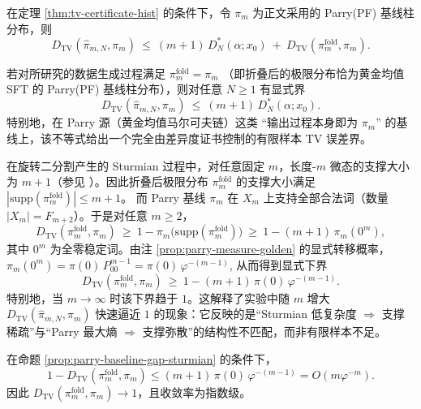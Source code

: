 

\begin{corollary}\label{cor:tv-decomposition-parry}
在定理 \ref{thm:tv-certificate-hist} 的条件下，令 $\pi_m$ 为正文采用的 Parry(PF) 基线柱分布，则
\[
D_{\mathrm{TV}}(\hat{\pi}_{m,N},\pi_m)
\ \le\
(m+1)\,D_N^*(\alpha;x_0)\ +\ D_{\mathrm{TV}}(\pi_m^{\mathrm{fold}},\pi_m).
\]
\end{corollary}

\begin{corollary}\label{cor:tv-to-parry-when-gap-zero}
若对所研究的数据生成过程满足
\(
\pi_m^{\mathrm{fold}}=\pi_m
\)
（即折叠后的极限分布恰为黄金均值 SFT 的 Parry(PF) 基线柱分布），则对任意 $N\ge 1$ 有显式界
\[
D_{\mathrm{TV}}(\hat{\pi}_{m,N},\pi_m)\ \le\ (m+1)\,D_N^*(\alpha;x_0).
\]
特别地，在 Parry 源（黄金均值马尔可夫链）这类 ``输出过程本身即为 $\pi_m$'' 的基线上，该不等式给出一个完全由差异度证书控制的有限样本 TV 误差界。
\end{corollary}

\begin{proposition}\label{prop:parry-baseline-gap-sturmian}
在旋转二分割产生的 Sturmian 过程中，对任意固定 $m$，长度-$m$ 微态的支撑大小为 $m+1$（参见 \cite{MorseHedlund1940,LindMarcus1995}）。因此折叠后极限分布 $\pi_m^{\mathrm{fold}}$ 的支撑大小满足
\(
|\mathrm{supp}(\pi_m^{\mathrm{fold}})|\le m+1
\)。
而 Parry 基线 $\pi_m$ 在 $X_m$ 上支持全部合法词（数量 $|X_m|=F_{m+2}$）。于是对任意 $m\ge 2$，
\[
D_{\mathrm{TV}}(\pi_m^{\mathrm{fold}},\pi_m)\ \ge\ 1-\pi_m\bigl(\mathrm{supp}(\pi_m^{\mathrm{fold}})\bigr)
\ \ge\ 1-(m+1)\,\pi_m(0^m),
\]
其中 $0^m$ 为全零稳定词。由注 \ref{prop:parry-measure-golden} 的显式转移概率，
\(
\pi_m(0^m)=\pi(0)\,P_{00}^{m-1}=\pi(0)\,\varphi^{-(m-1)}
\),
从而得到显式下界
\[
D_{\mathrm{TV}}(\pi_m^{\mathrm{fold}},\pi_m)\ \ge\ 1-(m+1)\,\pi(0)\,\varphi^{-(m-1)}.
\]
特别地，当 $m\to\infty$ 时该下界趋于 $1$。这解释了实验中随 $m$ 增大 $D_{\mathrm{TV}}(\hat{\pi}_{m,N},\pi_m)$ 快速逼近 $1$ 的现象：它反映的是“Sturmian 低复杂度 $\Rightarrow$ 支撑稀疏”与“Parry 最大熵 $\Rightarrow$ 支撑弥散”的结构性不匹配，而非有限样本不足。
\end{proposition}

\begin{corollary}\label{cor:parry-gap-exp}
在命题 \ref{prop:parry-baseline-gap-sturmian} 的条件下，
\[
1-D_{\mathrm{TV}}(\pi_m^{\mathrm{fold}},\pi_m)
\le (m+1)\,\pi(0)\,\varphi^{-(m-1)}
=O(m\varphi^{-m}).
\]
因此 $D_{\mathrm{TV}}(\pi_m^{\mathrm{fold}},\pi_m)\to 1$，且收敛率为指数级。
\end{corollary}

